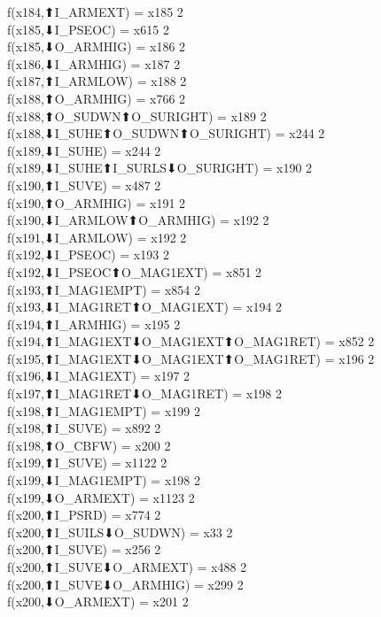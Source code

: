 f(x184,⬆I_ARMEXT) = x185 {2} \\
f(x185,⬇I_PSEOC) = x615 {2} \\
f(x185,⬇O_ARMHIG) = x186 {2} \\
f(x186,⬇I_ARMHIG) = x187 {2} \\
f(x187,⬆I_ARMLOW) = x188 {2} \\
f(x188,⬆O_ARMHIG) = x766 {2} \\
f(x188,⬆O_SUDWN⬆O_SURIGHT) = x189 {2} \\
f(x188,⬇I_SUHE⬆O_SUDWN⬆O_SURIGHT) = x244 {2} \\
f(x189,⬇I_SUHE) = x244 {2} \\
f(x189,⬇I_SUHE⬆I_SURLS⬇O_SURIGHT) = x190 {2} \\
f(x190,⬆I_SUVE) = x487 {2} \\
f(x190,⬆O_ARMHIG) = x191 {2} \\
f(x190,⬇I_ARMLOW⬆O_ARMHIG) = x192 {2} \\
f(x191,⬇I_ARMLOW) = x192 {2} \\
f(x192,⬇I_PSEOC) = x193 {2} \\
f(x192,⬇I_PSEOC⬆O_MAG1EXT) = x851 {2} \\
f(x193,⬆I_MAG1EMPT) = x854 {2} \\
f(x193,⬇I_MAG1RET⬆O_MAG1EXT) = x194 {2} \\
f(x194,⬆I_ARMHIG) = x195 {2} \\
f(x194,⬆I_MAG1EXT⬇O_MAG1EXT⬆O_MAG1RET) = x852 {2} \\
f(x195,⬆I_MAG1EXT⬇O_MAG1EXT⬆O_MAG1RET) = x196 {2} \\
f(x196,⬇I_MAG1EXT) = x197 {2} \\
f(x197,⬆I_MAG1RET⬇O_MAG1RET) = x198 {2} \\
f(x198,⬆I_MAG1EMPT) = x199 {2} \\
f(x198,⬆I_SUVE) = x892 {2} \\
f(x198,⬆O_CBFW) = x200 {2} \\
f(x199,⬆I_SUVE) = x1122 {2} \\
f(x199,⬇I_MAG1EMPT) = x198 {2} \\
f(x199,⬇O_ARMEXT) = x1123 {2} \\
f(x200,⬆I_PSRD) = x774 {2} \\
f(x200,⬆I_SUILS⬇O_SUDWN) = x33 {2} \\
f(x200,⬆I_SUVE) = x256 {2} \\
f(x200,⬆I_SUVE⬇O_ARMEXT) = x488 {2} \\
f(x200,⬆I_SUVE⬇O_ARMHIG) = x299 {2} \\
f(x200,⬇O_ARMEXT) = x201 {2} \\
